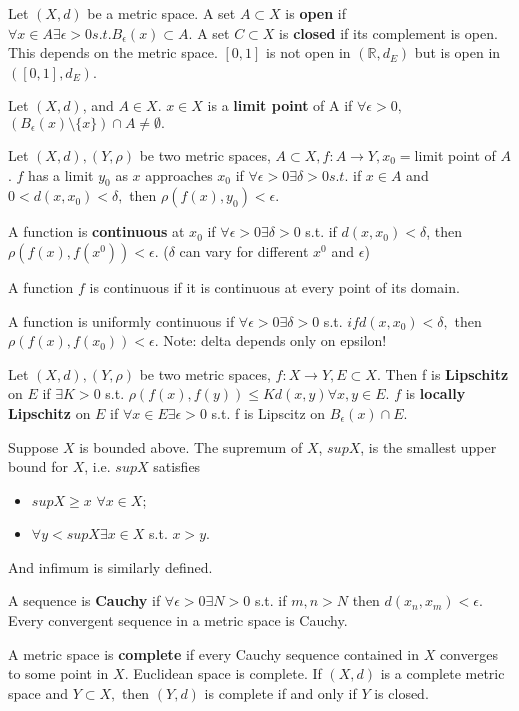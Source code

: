 \documentclass[11pt]{article} %
\begin{document}
Let $(X,d)$ be a metric space. A set $A\subset X$ is \textbf{open} if $\forall x \in A \exists \epsilon > 0 s.t. B_\epsilon(x) \subset A.$ A set $C \subset X$ is \textbf{closed} if its complement is open. This depends on the metric space. $[0,1]$ is not open in $(\mathbb{R},d_E)$ but is open in $([0,1],d_E)$.

Let $(X,d)$, and $A \in X$. $x \in X$ is a \textbf{limit point} of A if $\forall \epsilon > 0,$ $(B_{\epsilon}(x) \setminus \{ x\})\cap A \neq \emptyset.$

Let $(X,d),(Y,\rho)$ be two metric spaces, $A \subset X, f:A \rightarrow Y, x_0 =$limit point of $A$. $f$ has a limit $y_0$ as $x$ approaches $x_0$ if $\forall \epsilon>0 \exists \delta > 0 s.t.$ if $x \in A$ and $0<d(x,x_0) < \delta,$ then $\rho(f(x),y_0) < \epsilon.$

A function is \textbf{continuous} at $x_0$ if $\forall \epsilon>0 \exists \delta>0$ s.t. if $d(x,x_0) < \delta$, then $\rho(f(x),f(x^0)) < \epsilon$. ($\delta$ can vary for different $x^0$ and $\epsilon$)

A function $f$ is continuous if it is continuous at every point of its domain.

A function is uniformly continuous if $\forall \epsilon > 0 \exists \delta>0$ s.t. $if d(x,x_0)<\delta,$ then $\rho(f(x),f(x_0)) < \epsilon$. Note: delta depends only on epsilon!

Let $(X,d),(Y,\rho)$ be two metric spaces, $f:X \rightarrow Y, E\subset X.$ Then f is \textbf{Lipschitz} on $E$ if $\exists K>0$ s.t. $\rho(f(x),f(y)) \leq K d(x,y) \forall x,y \in E.$ $f$ is \textbf{locally Lipschitz} on $E$ if $\forall x \in E \exists \epsilon > 0$ s.t. f is Lipscitz on $B_{\epsilon}(x) \cap E.$

Suppose $X$ is bounded above. The supremum of $X$, $sup X$, is the smallest upper bound for $X$, i.e. $supX$ satisfies
\begin{itemize}
\item $supX \geq x$ $\forall x \in X$;
\item $\forall y<supX \exists x \in X$ s.t. $x>y$.
\end{itemize}
 And infimum is similarly defined.

A sequence is \textbf{Cauchy} if $\forall \epsilon > 0 \exists N > 0$ s.t. if $m,n>N$ then $d(x_n,x_m)<\epsilon.$ Every convergent sequence in a metric space is Cauchy.

A metric space is \textbf{complete} if every Cauchy sequence contained in $X$ converges to some point in $X$. Euclidean space is complete. If $(X,d)$ is a complete metric space and $Y \subset X,$ then $(Y,d)$ is complete if and only if $Y$ is closed.
\end{document}
